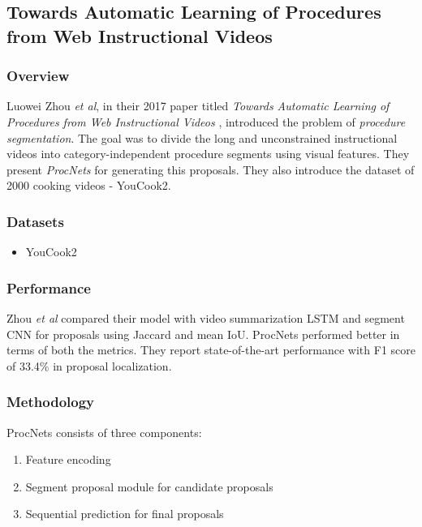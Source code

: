 \subsection{Towards Automatic Learning of Procedures from Web Instructional Videos}

\subsubsection{Overview}

\par Luowei Zhou \textit{et al}, in their 2017 paper titled \textit{Towards Automatic Learning of Procedures from Web Instructional Videos} \cite{zhou2017automatic}, introduced the problem of \textit{procedure segmentation}. The goal was to divide the long and unconstrained instructional videos into category-independent procedure segments using visual features. They present \textit{ProcNets} for generating this proposals. They also introduce the dataset of 2000 cooking videos - YouCook2.


\subsubsection{Datasets}
\begin{itemize}
\item YouCook2
\end{itemize}

\subsubsection{Performance}
\par Zhou \textit{et al} compared their model with video summarization LSTM and segment CNN for proposals using Jaccard and mean IoU. ProcNets performed better in terms of both the metrics. They report state-of-the-art performance with F1 score of 33.4\% in proposal localization.


\subsubsection{Methodology}

\par ProcNets consists of three components:
\begin{enumerate}
	\item Feature encoding
	\item Segment proposal module for candidate proposals
	\item Sequential prediction for final proposals
\end{enumerate}

